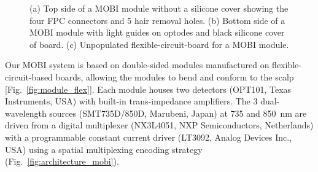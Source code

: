 \begin{figure}
\begin{minipage}{.35\textwidth}
\begin{center}
	    \end{center}  
    \end{minipage}%
	\caption{(a) Top side of a MOBI module without a silicone cover showing the four FPC connectors and 5 hair removal holes. (b) Bottom side of a MOBI module with light guides on optodes and black silicone cover of board. (c) Unpopulated flexible-circuit-board for a MOBI module.} 
	\label{fig:module}
\end{figure}

Our MOBI system is based on double-sided modules manufactured on flexible-circuit-based boards, allowing the modules to bend and conform to the scalp [Fig.~\ref{fig:module_flex}]. Each module houses two detectors (OPT101, Texas Instruments, USA) with built-in trans-impedance amplifiers. The 3 dual-wavelength sources (SMT735D/850D, Marubeni, Japan) at 735 and 850~nm are driven from a digital multiplexer (NX3L4051, NXP Semiconductors, Netherlands) with a programmable constant current driver (LT3092, Analog Devices Inc., USA) using a spatial multiplexing encoding strategy (Fig.~\ref{fig:architecture_mobi}). 

